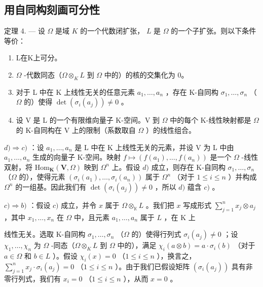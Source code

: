 \subsection{用自同构刻画可分性}

定理 4. --- 设 \(\Omega\) 是域 \(K\) 的一个代数闭扩张， \(L\) 是 \(\Omega\) 的一个子扩张。则以下条件等价：

\begin{enumerate}
\def\labelenumi{\alph{enumi})}
\item
  L在K上可分。
\item
  \(\Omega\) -代数同态（\(\Omega \otimes_{K} L\) 到 \(\Omega\) 中的）的核的交集化为 0。
\item
  对于 L 中在 K 上线性无关的任意元素 \(a_1, \ldots, a_n\) ，存在 K-自同构 \(\sigma_1, \ldots, \sigma_n\) （\(\Omega\) 的）使得 \(\det(\sigma_i(a_j)) \neq 0\) 。
\item
  设 V 是 L 的一个有限维向量子 K-空间。V 到 \(\Omega\) 中的每个 K-线性映射都是 \(\Omega\) 的 K-自同构在 V 上的限制（系数取自 \(\Omega\) ）的线性组合。
\end{enumerate}

\(d) \Rightarrow c)\) ：设 \(a_1, \ldots, a_n\) 是 L 中在 K 上线性无关的元素，并设 V 为 L 中由 \(a_1, \ldots, a_n\) 生成的向量子 K-空间。映射 \(f \mapsto (f(a_1), \ldots, f(a_n))\) 是一个 \(\Omega\) -线性双射，将 \(\mathrm{Hom}_{\mathbf{K}}(\mathbf{V}, \Omega)\) 映到 \(\Omega^n\) 上。假设 \(d)\) 成立，则存在 K-自同构 \(\sigma_1, \ldots, \sigma_n\) （\(\Omega\) 的），使得元素 \((\sigma_i(a_1), \ldots, \sigma_i(a_n))\) 属于 \(\Omega^n\) （对于 \(1 \leqslant i \leqslant n\) ）并构成 \(\Omega^n\) 的一组基。因此我们有 \(\det(\sigma_i(a_j)) \neq 0\) ，所以 \(d)\) 蕴含 \(c)\) 。

\(c) \Rightarrow b)\) ：假设 \(c)\) 成立，并令 \(x\) 属于 \(\Omega \otimes_{\mathbb{K}} L\) 。我们把 \(x\) 写成形式 \(\sum_{j=1}^{n} x_j \otimes a_j\) ，其中 \(x_1, \ldots, x_n\) 在 \(\Omega\) 中，且元素 \(a_1, \ldots, a_n\) 属于 \(L\) ，在 K 上

线性无关。选取 K-自同构 \(\sigma_{1},\ldots,\sigma_{n}\) （\(\Omega\) 的）使得行列式 \(\sigma_{i}(a_{j})\neq0\) ；设 \(\chi_{1},\ldots,\chi_{n}\) 为 \(\Omega\) -同态（\(\Omega\otimes_{K}L\) 到 \(\Omega\) 中的），满足 \(\chi_{i}(a\otimes b)=a\cdot\sigma_{i}(b)\) （对于 \(a\in\Omega\) 和 \(b\in L\) ）。假设 \(\chi_{i}(x)=0\) （\(1\leqslant i\leqslant n\) ），换言之， \(\sum_{j=1}^{n}x_{j}\cdot\sigma_{i}(a_{j})=0\) （\(1\leqslant i\leqslant n\) ）。由于我们已假设矩阵 \((\sigma_{i}(a_{j}))\) 具有非零行列式，我们有 \(x_{i}=0\) （\(1\leqslant i\leqslant n\) ），从而 \(x=0\) 。

